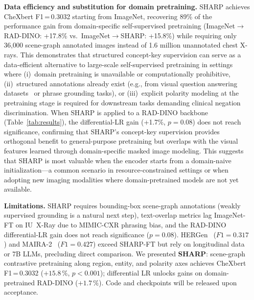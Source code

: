 \documentclass[runningheads]{llncs}
\begin{document}
\noindent\textbf{Data efficiency and substitution for domain pretraining.}
SHARP achieves CheXbert F1\,=\,0.3032 starting from ImageNet, recovering
89\% of the performance gain from domain-specific self-supervised
pretraining (ImageNet$\to$RAD-DINO: +17.8\% vs.\ ImageNet$\to$SHARP:
+15.8\%) while requiring only 36,000 scene-graph annotated images instead
of 1.6 million unannotated chest X-rays.
This demonstrates that structured concept-key supervision can serve as a
data-efficient alternative to large-scale self-supervised pretraining in
settings where (i)~domain pretraining is unavailable or computationally
prohibitive, (ii)~structured annotations already exist (e.g., from visual
question answering datasets~\cite{mimicextcxrqba} or phrase grounding
tasks), or (iii)~explicit polarity modeling at the pretraining stage is
required for downstream tasks demanding clinical negation discrimination.
When SHARP is applied to a RAD-DINO backbone (Table~\ref{tab:results}),
the differential-LR gain (+1.7\%, $p{=}0.08$) does not reach significance,
confirming that SHARP's concept-key supervision provides orthogonal
benefit to general-purpose pretraining but overlaps with the visual
features learned through domain-specific masked image modeling.
This suggests that SHARP is most valuable when the encoder starts from a
domain-naive initialization---a common scenario in resource-constrained
settings or when adopting new imaging modalities where domain-pretrained
models are not yet available.

\noindent\textbf{Limitations.}
SHARP requires bounding-box scene-graph annotations (weakly supervised
grounding is a natural next step), text-overlap metrics lag ImageNet-FT
on IU~X-Ray due to MIMIC-CXR phrasing bias, and the RAD-DINO
differential-LR gain does not reach significance ($p{=}0.08$).
HERGen~\cite{hergen} ($F1{=}0.317$) and MAIRA-2~\cite{maira2}
($F1{=}0.427$) exceed SHARP-FT but rely on longitudinal data or 7B
LLMs, precluding direct comparison.
We presented \textbf{SHARP}: scene-graph contrastive pretraining along
region, entity, and polarity axes achieves CheXbert F1\,=\,0.3032
($+15.8\,\%$, $p{<}0.001$); differential LR unlocks gains on
domain-pretrained RAD-DINO ($+1.7\,\%$).
Code and checkpoints will be released upon acceptance.



\end{document}
